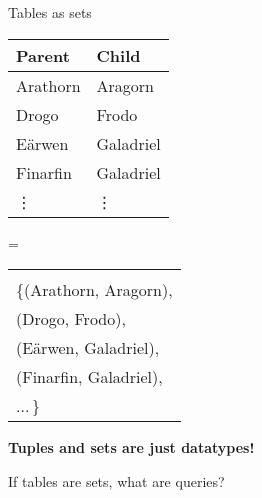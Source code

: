 \documentclass[xcolor=table,usenames,dvipsnames,svgnames]{beamer}
\begin{document}

\begin{frame}{Tables as sets}\large
  \begin{minipage}{0.4\textwidth}
    \centering
    \begin{tabular}{ll}
      \textbf{Parent} & \textbf{Child}\\\midrule
      Arathorn & Aragorn\\
      Drogo & Frodo\\
      E\"arwen & Galadriel\\
      Finarfin & Galadriel\\
      \hfill\vdots & \hfill\vdots
    \end{tabular}


  \end{minipage}
  \hfill{\LARGE =}\hfill
  \begin{minipage}{0.53\textwidth}
    \centering

    \begin{tabular}{l}
      \color{gray}{// set of (parent, child) pairs}\\
      \{(Arathorn, Aragorn),\\
      \phantom{\{}(Drogo, Frodo),\\
      \phantom{\{}(E\"arwen, Galadriel),\\
      \phantom{\{}(Finarfin, Galadriel),\\
      \phantom{\{}...\,\} \phantom{\vdots}
    \end{tabular}

  \end{minipage}

\end{frame}


\begin{frame}\Large\centering
  \bf Tuples and sets are just datatypes!

  \vspace{2em}\pause

  If tables are sets, what are queries?
\end{frame}
\end{document}
